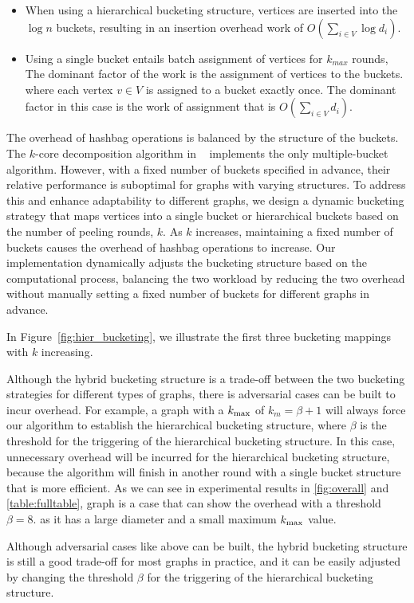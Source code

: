 {\begin{itemize}
    \item When using a hierarchical bucketing structure,
    vertices are inserted into the $\log n$ buckets,
    resulting in an insertion overhead work of $O(\sum_{i \in V} \log d_i)$.
    \item Using a single bucket entails batch assignment of vertices for $k_{max}$ rounds,
    The dominant factor of the work is the assignment of vertices to the buckets.
    where each vertex $v \in V$ is assigned to a bucket exactly once.
    The dominant factor in this case is the work of assignment that is $O(\sum_{i \in V} d_i)$.

\end{itemize}

The overhead of hashbag operations is balanced by the structure of the buckets.
The $k$-core decomposition algorithm in \Julienne~\cite{dhulipala2017} implements the only multiple-bucket algorithm.
However, with a fixed number of buckets specified in advance, their relative performance is suboptimal for graphs with varying structures.
To address this and enhance adaptability to different graphs,
we design a dynamic bucketing strategy that maps vertices into a single bucket or hierarchical buckets based on the number of peeling rounds, $k$.
As $k$ increases,
maintaining a fixed number of buckets causes the overhead of hashbag operations to increase.
Our implementation dynamically adjusts the bucketing structure based on the computational process,
balancing the two workload by reducing the two overhead
without manually setting a fixed number of buckets for different graphs in advance.


In Figure~\ref{fig:hier_bucketing}, we illustrate the first three bucketing mappings with $k$ increasing.

Although the hybrid bucketing structure is a trade-off between the two bucketing strategies for different types of graphs,
there is adversarial cases can be built to incur overhead.
For example, a graph with a ${k_{\max}}$ of $k_m = \beta + 1$ will always force our algorithm to establish the hierarchical bucketing structure,
where $\beta$ is the threshold for the triggering of the hierarchical bucketing structure.
In this case, unnecessary overhead will be incurred for the hierarchical bucketing structure,
because the algorithm will finish in another round with a single bucket structure that is more efficient.
As we can see in experimental results in \cref{fig:overall} and \cref{table:fulltable}, graph \GLsfull is a case that can show the overhead with a threshold $\beta = 8$.
as it has a large diameter and a small maximum ${k_{\max}}$ value.

Although adversarial cases like above can be built,
the hybrid bucketing structure is still a good trade-off for most graphs in practice,
and it can be easily adjusted by changing the threshold $\beta$ for the triggering of the hierarchical bucketing structure.
}


